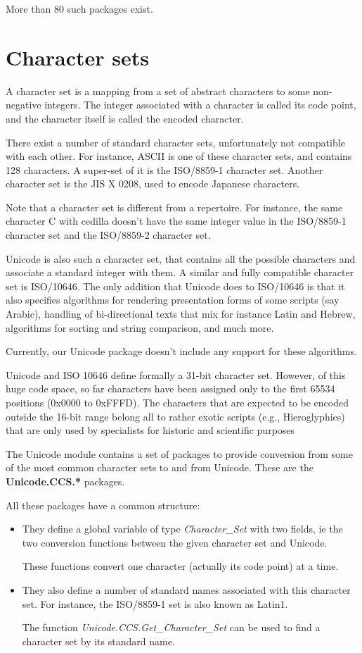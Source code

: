 \documentclass[letterpaper,10pt,english]{sphinxmanual}
\begin{document}
More than 80 such packages exist.


\section{Character sets}
\label{unicode:character-sets}
A character set is a mapping from a set of abstract characters to some
non-negative integers. The integer associated with a character is called its
code point, and the character itself is called the encoded character.

There exist a number of standard character sets, unfortunately not compatible
with each other. For instance, ASCII is one of these character sets, and
contains 128 characters. A super-set of it is the ISO/8859-1 character set.
Another character set is the JIS X 0208, used to encode Japanese characters.

Note that a character set is different from a repertoire. For instance, the
same character C with cedilla doesn't have the same integer value in the
ISO/8859-1 character set and the ISO/8859-2 character set.

Unicode is also such a character set, that contains all the possible characters
and associate a standard integer with them. A similar and fully compatible
character set is ISO/10646. The only addition that Unicode does to ISO/10646 is
that it also specifies algorithms for rendering presentation forms of some
scripts (say Arabic), handling of bi-directional texts that mix for instance
Latin and Hebrew, algorithms for sorting and string comparison, and much more.

Currently, our Unicode package doesn't include any support for these
algorithms.

Unicode and ISO 10646 define formally a 31-bit character set. However, of this
huge code space, so far characters have been assigned only to the first 65534
positions (0x0000 to 0xFFFD). The characters that are expected to be encoded
outside the 16-bit range belong all to rather exotic scripts (e.g.,
Hieroglyphics) that are only used by specialists for historic and scientific
purposes

The Unicode module contains a set of packages to provide conversion from some
of the most common character sets to and from Unicode. These are the
\textbf{Unicode.CCS.*} packages.

All these packages have a common structure:
\begin{itemize}
\item {} 
They define a global variable of type \emph{Character\_Set} with two fields, ie the
two conversion functions between the given character set and Unicode.

These functions convert one character (actually its code point) at a time.

\item {} 
They also define a number of standard names associated with this character
set. For instance, the ISO/8859-1 set is also known as Latin1.

The function \emph{Unicode.CCS.Get\_Character\_Set} can be used to find a character
set by its standard name.

\end{itemize}
\end{document}
